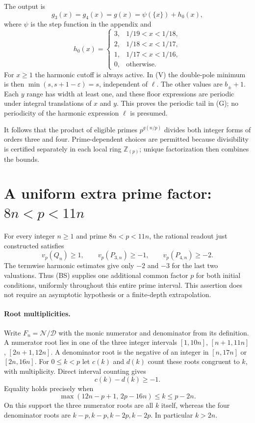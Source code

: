 \documentclass[11pt]{article}
\begin{document}
The output is
\[
 g_3(x)=g_4(x)=g(x)=\psi(\{x\})+h_0(x),
 \tag{G}
\]
where $\psi$ is the step function in the appendix and
\[
 h_0(x)=
 \begin{cases}
 3,&1/19<x<1/18,\\
 2,&1/18<x<1/17,\\
 1,&1/17<x<1/16,\\
 0,&\text{otherwise}.
 \end{cases}
\]
For $x\ge1$ the harmonic cutoff is always active. In (V) the double-pole
minimum is then $\min(s,s+1-\varepsilon)=s$, independent of $\ell$.
The other values are $b_\pm+1$. Each $y$ range has width at least one, and
these floor expressions are periodic under integral translations of $x$
and $y$. This proves the periodic tail in (G); no periodicity of the
harmonic expression $\ell$ is presumed.

It follows that the product of eligible primes $p^{g(n/p)}$ divides both
integer forms of orders three and four. Prime-dependent choices are
permitted because divisibility is certified separately in each local
ring $\mathbb Z_{(p)}$; unique factorization then combines the bounds.

\section{A uniform extra prime factor: $8n<p<11n$}
For every integer $n\ge1$ and prime $8n<p<11n$, the rational readout just
constructed satisfies
\[
 v_p(Q_n)\ge1,\qquad v_p(P_{3,n})\ge-1,\qquad
 v_p(P_{4,n})\ge-2.                                      \tag{BS}
\]
The termwise harmonic estimates give only $-2$ and $-3$ for the last two
valuations.  Thus (BS) supplies one additional common factor $p$ for both
initial conditions, uniformly throughout this entire prime interval.
This assertion does not require an asymptotic hypothesis or a finite-depth
extrapolation.

\paragraph{Root multiplicities.}
Write $F_n=\mathcal N/\mathcal D$ with the monic numerator and denominator
from its definition.  A numerator root lies in one of the three integer
intervals $[1,10n]$, $[n+1,11n]$, $[2n+1,12n]$.  A denominator root is the
negative of an integer in $[n,17n]$ or $[2n,16n]$.
For $0\le k<p$ let $c(k)$ and $d(k)$ count these roots congruent to $k$,
with multiplicity.  Direct interval counting gives
\[
 c(k)-d(k)\ge-1.
\]
Equality holds precisely when
\[
 \max(12n-p+1,\,2p-16n)\le k\le p-2n.                  \tag{S}
\]
On this support the three numerator roots are all $k$ itself, whereas the
four denominator roots are $k-p,k-p,k-2p,k-2p$.
In particular $k>2n$.
\end{document}
